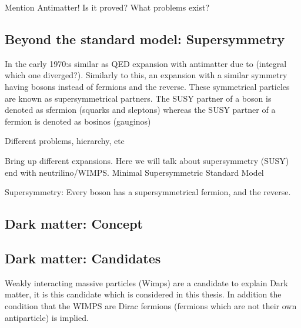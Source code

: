 Mention Antimatter!
Is it proved? What problems exist? 

\subsection{Beyond the standard model: Supersymmetry}
In the early 1970:s similar as QED expansion with antimatter due to (integral which one diverged?). Similarly to this, an expansion with a similar symmetry having bosons instead of fermions and the reverse. These symmetrical particles are known as supersymmetrical partners. The SUSY partner of a boson is denoted as sfermion (squarks and sleptons) whereas the SUSY partner of a fermion is denoted as bosinos (gauginos)

Different problems, hierarchy, etc

Bring up different expansions. Here we will talk about supersymmetry (SUSY) end with neutrilino/WIMPS. 
Minimal Supersymmetric Standard Model

Supersymmetry: Every boson has a supersymmetrical fermion, and the reverse.
\subsection{Dark matter: Concept}
\subsection{Dark matter: Candidates}
Weakly interacting massive particles (Wimps) are a candidate to explain Dark matter, it is this candidate which is considered in this thesis.
In addition the condition that the WIMPS are Dirac fermions (fermions which are not their own antiparticle) is implied.

